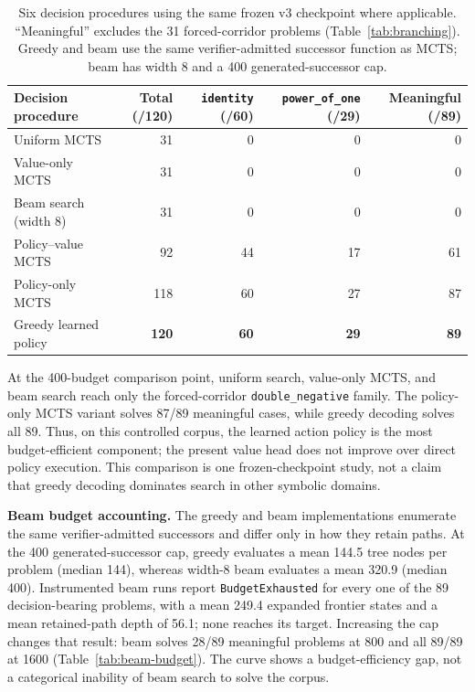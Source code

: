 \documentclass[11pt]{article}
\numberwithin{equation}{section}
\newcommand{\good}{89}
\begin{document}
\begin{table}[t]
\centering
\small
\begin{tabular}{@{}lrrrr@{}}
\toprule
Decision procedure & Total (/120) & \texttt{identity} (/60) & \texttt{power\_of\_one} (/29) & Meaningful (/\good{}) \\
\midrule
Uniform MCTS & 31 & 0 & 0 & 0 \\
Value-only MCTS & 31 & 0 & 0 & 0 \\
Beam search (width 8) & 31 & 0 & 0 & 0 \\
Policy--value MCTS & 92 & 44 & 17 & 61 \\
Policy-only MCTS & 118 & 60 & 27 & 87 \\
Greedy learned policy & \textbf{120} & \textbf{60} & \textbf{29} & \textbf{89} \\
\bottomrule
\end{tabular}
\caption{Six decision procedures using the same frozen v3 checkpoint where applicable. ``Meaningful'' excludes the 31 forced-corridor problems (Table~\ref{tab:branching}). Greedy and beam use the same verifier-admitted successor function as MCTS; beam has width 8 and a 400 generated-successor cap.}
\label{tab:headline}
\end{table}

At the 400-budget comparison point, uniform search, value-only MCTS, and beam search reach only the forced-corridor \texttt{double\_negative} family. The policy-only MCTS variant solves 87/89 meaningful cases, while greedy decoding solves all 89. Thus, on this controlled corpus, the learned action policy is the most budget-efficient component; the present value head does not improve over direct policy execution. This comparison is one frozen-checkpoint study, not a claim that greedy decoding dominates search in other symbolic domains.

\textbf{Beam budget accounting.} The greedy and beam implementations enumerate the same verifier-admitted successors and differ only in how they retain paths. At the 400 generated-successor cap, greedy evaluates a mean 144.5 tree nodes per problem (median 144), whereas width-8 beam evaluates a mean 320.9 (median 400). Instrumented beam runs report \texttt{BudgetExhausted} for every one of the 89 decision-bearing problems, with a mean 249.4 expanded frontier states and a mean retained-path depth of 56.1; none reaches its target. Increasing the cap changes that result: beam solves 28/89 meaningful problems at 800 and all 89/89 at 1600 (Table~\ref{tab:beam-budget}). The curve shows a budget-efficiency gap, not a categorical inability of beam search to solve the corpus.
\end{document}
